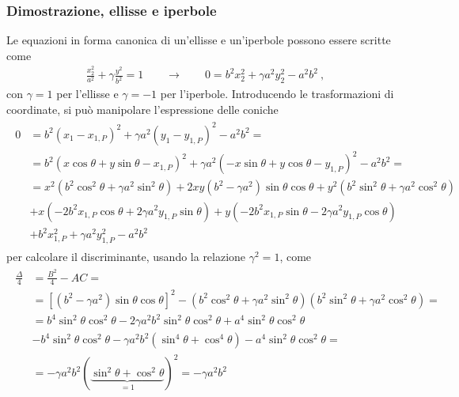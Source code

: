 \documentclass[letterpaper,10pt,english]{jupyterBook}
\begin{document}
\subsubsection*{Dimostrazione, ellisse e iperbole}

\sphinxAtStartPar
Le equazioni in forma canonica di un’ellisse e un’iperbole possono essere scritte come
\begin{equation*}
\begin{split}\frac{x_2^2}{a^2} + \gamma \frac{y^2}{b^2} = 1 \qquad \rightarrow \qquad 0 = b^2 x_2^2 + \gamma a^2 y_2^2 - a^2 b^2 \ ,\end{split}
\end{equation*}
\sphinxAtStartPar
con \(\gamma = 1\) per l’ellisse e \(\gamma = -1\) per l’iperbole. Introducendo le trasformazioni di coordinate, si può manipolare l’espressione delle coniche
\begin{equation*}
\begin{split}\begin{aligned}
  0 
  & = b^2 ( x_1 - x_{1,P} )^2 + \gamma a^2 ( y_1 - y_{1,P} )^2 - a^2 b^2 = \\
  & = b^2 ( x \cos \theta + y \sin \theta - x_{1,P} )^2 + \gamma a^2 ( - x \sin \theta + y \cos \theta - y_{1,P} )^2 - a^2 b^2 = \\
  & = x^2   \left( b^2 \cos^2 \theta + \gamma a^2 \sin^2 \theta \right)
    + 2 x y \left( b^2 - \gamma a^2 \right) \sin \theta \cos \theta 
    + y^2   \left( b^2 \sin^2 \theta + \gamma a^2 \cos^2 \theta \right) \\
  & + x     \left( - 2 b^2 x_{1,P} \cos \theta + 2 \gamma a^2 y_{1,P} \sin \theta \right) 
    + y     \left( - 2 b^2 x_{1,P} \sin \theta - 2 \gamma a^2 y_{1,P} \cos \theta \right) \\
  & + b^2 x_{1,P}^2 + \gamma a^2 y_{1,P}^2 - a^2 b^2 
\end{aligned}\end{split}
\end{equation*}
\sphinxAtStartPar
per calcolare il discriminante, usando la relazione \(\gamma^2 = 1\), come
\begin{equation*}
\begin{split}\begin{aligned}
  \frac{\Delta}{4}
  & = \frac{B^2}{4} - AC = \\
  & = \left[ \left( b^2 - \gamma a^2 \right) \sin \theta \cos \theta \right]^2 - \left( b^2 \cos^2 \theta + \gamma a^2 \sin^2 \theta \right) \left( b^2 \sin^2 \theta + \gamma a^2 \cos^2 \theta \right) = \\
  & = b^4 \sin^2 \theta \cos^2 \theta - 2 \gamma a^2 b^2 \sin^2 \theta \cos^2 \theta + a^4 \sin^2 \theta \cos^2 \theta \\
  & - b^4 \sin^2 \theta \cos^2 \theta - \gamma a^2 b^2 \left( \sin^4 \theta + \cos^4 \theta \right) - a^4 \sin^2 \theta \cos^2 \theta = \\
  & = - \gamma a^2 b^2 \left(\underbrace{ \sin^2 \theta + \cos^2 \theta}_{=1} \right)^2 = - \gamma a^2 b^2
\end{aligned}\end{split}
\end{equation*}
\end{document}
